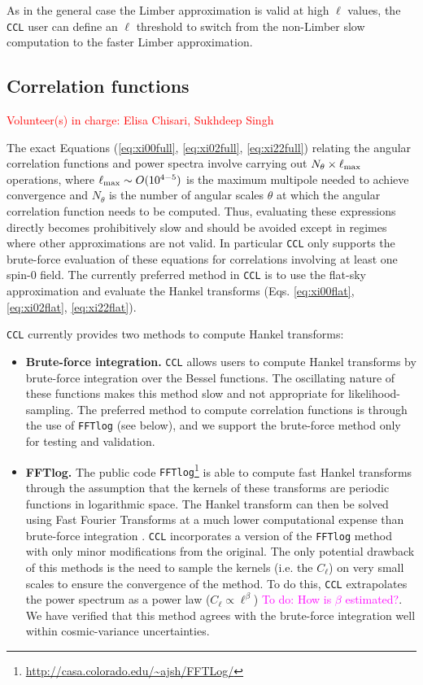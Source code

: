 \documentclass[\docopts]{\docclass}
\newcommand{\todo}[1]{\textcolor{magenta}{To do: #1}}
\newcommand{\vol}[1]{\textcolor{red}{Volunteer(s) in charge: #1}}
\newcommand{\ccl}{{\tt CCL}\xspace}
\begin{document}
As in the general case the Limber approximation is valid at high $\ell$ values, the \ccl user can define an $\ell$ threshold to switch from the non-Limber slow computation to the faster Limber approximation.
 


\subsection{Correlation functions}
\vol{Elisa Chisari, Sukhdeep Singh}


The exact Equations (\ref{eq:xi00full}, \ref{eq:xi02full}, \ref{eq:xi22full}) relating the angular correlation functions and power spectra involve carrying out $N_\theta\times\ell_{\rm max}$ operations, where $\ell_{\rm max}\sim O(10^{4-5})$ is the maximum multipole needed to achieve convergence and $N_\theta$ is the number of angular scales $\theta$ at which the angular correlation function needs to be computed. Thus, evaluating these expressions directly becomes prohibitively slow and should be avoided except in regimes where other approximations are not valid. In particular \ccl only supports the brute-force evaluation of these equations for correlations involving at least one spin-0 field. The currently preferred method in \ccl is to use the flat-sky approximation and evaluate the Hankel transforms (Eqs. \ref{eq:xi00flat}, \ref{eq:xi02flat}, \ref{eq:xi22flat}).

\ccl currently provides two methods to compute Hankel transforms:
\begin{itemize}
 \item {\bf Brute-force integration.} \ccl allows users to compute Hankel transforms by brute-force integration over the Bessel functions. The oscillating nature of these functions makes this method slow and not appropriate for likelihood-sampling. The preferred method to compute correlation functions is through the use of {\tt FFTlog} (see below), and we support the brute-force method only for testing and validation.
 \item {\bf FFTlog.} The public code {\tt FFTlog}\footnote{\url{http://casa.colorado.edu/~ajsh/FFTLog/}} is able to compute fast Hankel transforms through the assumption that the kernels of these transforms are periodic functions in logarithmic space. The Hankel transform can then be solved using Fast Fourier Transforms at a much lower computational expense than brute-force integration \citep{Hamilton2000,Talman2009}. \ccl incorporates a version of the {\tt FFTlog} method with only minor modifications from the original. The only potential drawback of this methods is the need to sample the kernels (i.e. the $C_\ell$) on very small scales to ensure the convergence of the method. To do this, \ccl extrapolates the power spectrum as a power law ($C_\ell\propto\ell^\beta$) \todo{How is $\beta$ estimated?}. We have verified that this method agrees with the brute-force integration  well within cosmic-variance uncertainties.
\end{itemize}
\end{document}

